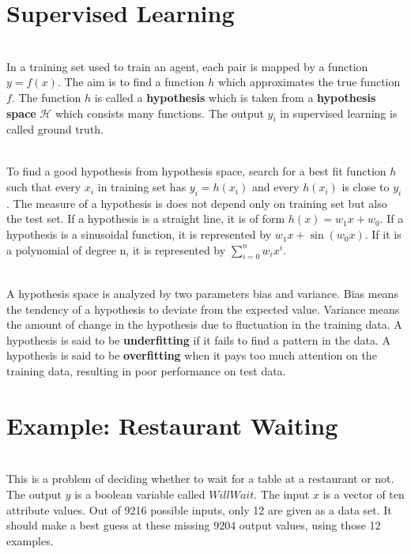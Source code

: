\documentclass{article}
\begin{document}
\section{Supervised Learning}
\begin{paragraph}
\\
In a training set used to train an agent, each pair is mapped by a function $y=f(x)$. The aim is to find a function $h$ which approximates the true function $f$. The function $h$ is called a \textbf{hypothesis} which is taken from a \textbf{hypothesis space} $\mathcal{H}$ which consists many functions. The output $y_i$ in supervised learning is called ground truth.
\end{paragraph}
\begin{paragraph}
\\
To find a good hypothesis from hypothesis space, search for a best fit function $h$ such that every $x_i$ in training set has $y_i=h(x_i)$ and every $h(x_i)$ is close to $y_i$. The measure of a hypothesis is does not depend only on training set but also the test set. If a hypothesis is a straight line, it is of form $h(x)=w_1x+w_0$. If a hypothesis is a sinusoidal function, it is represented by $w_1x+\sin{(w_0x)}$. If it is a polynomial of degree n, it is represented by $\sum_{i=0}^{n} w_ix^i$.
\end{paragraph}
\begin{paragraph}
\\
A hypothesis space is analyzed by two parameters bias and variance. Bias means the tendency of a hypothesis to deviate from the expected value. Variance means the amount of change in the hypothesis due to fluctuation in the training data. A hypothesis is said to be \textbf{underfitting} if it fails to find a pattern in the data. A hypothesis is said to be \textbf{overfitting} when it pays too much attention on the training data, resulting in poor performance on test data.
\end{paragraph}
\section{Example: Restaurant Waiting}
\begin{paragraph}
\\
This is a problem of deciding whether to wait for a table at a restaurant or not. The output $y$ is a boolean variable called $WillWait$. The input $x$ is a vector of ten attribute values. Out of 9216 possible inputs, only 12 are given as a data set. It should make a best guess at these missing 9204 output values, using those 12 examples.
\end{paragraph}
\end{document}
